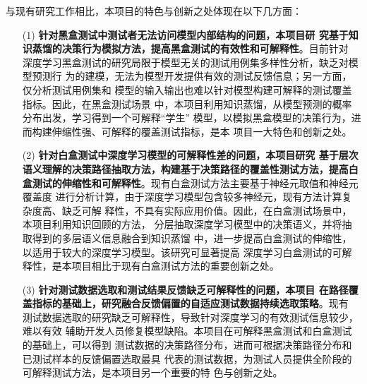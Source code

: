 与现有研究工作相比，本项目的特色与创新之处体现在以下几方面：

\begin{itemize}
    \item[(1)] \textbf{针对黑盒测试中测试者无法访问模型内部结构的问题，本项目研
    究基于知识蒸馏的决策行为模拟方法，提高黑盒测试的有效性和可解释性}。目前针对
    深度学习黑盒测试的研究局限于模型无关的测试用例集多样性分析，缺乏对模型预测行
    为的建模，无法为模型开发提供有效的测试反馈信息；另一方面，仅分析测试用例集和
    模型的输入输出也难以针对模型构建可解释的测试覆盖指标。因此，在黑盒测试场景
    中，本项目利用知识蒸馏，从模型预测的概率分布出发，学习得到一个可解释``学生''
    模型，以模拟黑盒模型的决策行为，进而构建伸缩性强、可解释的覆盖测试指标，是本
    项目一大特色和创新之处。
    \item[(2)] \textbf{针对白盒测试中深度学习模型的可解释性差的问题，本项目研究
    基于层次语义理解的决策路径抽取方法，构建基于决策路径的覆盖性测试方法，提高白
    盒测试的伸缩性和可解释性}。现有白盒测试方法主要基于神经元取值和神经元覆盖度
    进行分析计算，由于深度学习模型包含较多神经元，现有方法计算复杂度高、缺乏可解
    释性，不具有实际应用价值。因此，在白盒测试场景中，本项目利用知识回顾的方法，
    分层抽取深度学习模型中的决策语义，并将抽取得到的多层语义信息融合到知识蒸馏
    中，进一步提高白盒测试的伸缩性，以适用于较大的深度学习模型。该研究可显著提高
    深度学习白盒测试的可解释性，是本项目相比于现有白盒测试方法的重要创新之处。
    \item[(3)] \textbf{针对测试数据选取和测试结果反馈缺乏可解释性的问题，本项目
    在路径覆盖指标的基础上，研究融合反馈偏置的自适应测试数据持续选取策略}。现有
    测试数据选取的研究缺乏可解释性，导致针对深度学习的有效测试信息较少，难以有效
    辅助开发人员修复模型缺陷。本项目在可解释黑盒测试和白盒测试的基础上，可以得到
    测试数据的决策路径分布，进而可根据决策路径分布和已测试样本的反馈偏置选取最具
    代表的测试数据，为测试人员提供全阶段的可解释测试方法，是本项目另一个重要的特
    色与创新之处。
\end{itemize}